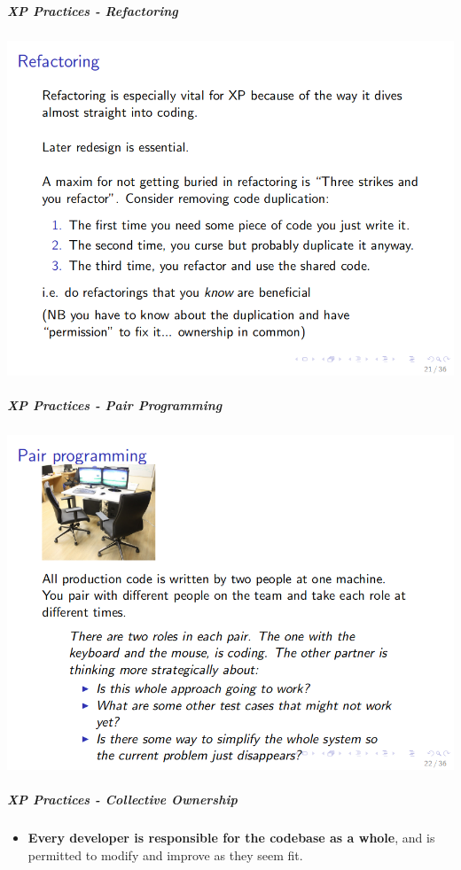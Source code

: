 \documentclass[a4paper]{article}
\providecommand{\tightlist}{%
  \setlength{\itemsep}{0pt}\setlength{\parskip}{0pt}}
\let\oldsubparagraph\subparagraph
\renewcommand{\subparagraph}[1]{\oldsubparagraph{#1}\mbox{}}
\begin{document}
\hypertarget{xp-practices---refactoring}{%
\subparagraph{XP Practices -
Refactoring}\label{xp-practices---refactoring}}

\includegraphics{2C-SE.assets/1543147982905.png}

\hypertarget{xp-practices---pair-programming}{%
\subparagraph{XP Practices - Pair
Programming}\label{xp-practices---pair-programming}}

\includegraphics{2C-SE.assets/1543148029020.png}

\hypertarget{xp-practices---collective-ownership}{%
\subparagraph{XP Practices - Collective
Ownership}\label{xp-practices---collective-ownership}}

\begin{itemize}
\tightlist
\item
  \textbf{Every developer is responsible for the codebase as a whole},
  and is permitted to modify and improve as they seem fit.
\end{itemize}
\end{document}
